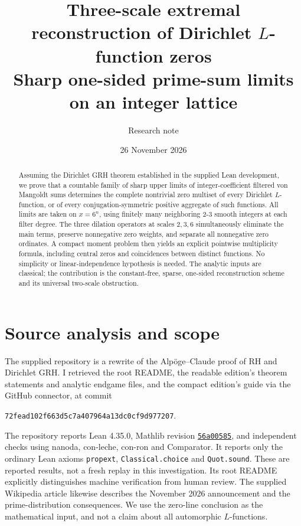 \documentclass[11pt]{article}
\title{Three-scale extremal reconstruction of Dirichlet $L$-function zeros\\[4pt]\large Sharp one-sided prime-sum limits on an integer lattice}
\author{Research note}
\date{26 November 2026}
\theoremstyle{remark}\newtheorem{remark}[theorem]{Remark}
\begin{document}
\maketitle
\begin{abstract}
Assuming the Dirichlet GRH theorem established in the supplied Lean development, we prove that a countable family of sharp upper limits of integer-coefficient filtered von Mangoldt sums determines the complete nontrivial zero multiset of every Dirichlet $L$-function, or of every conjugation-symmetric positive aggregate of such functions. All limits are taken on $x=6^n$, using finitely many neighboring $2$-$3$ smooth integers at each filter degree. The three dilation operators at scales $2,3,6$ simultaneously eliminate the main terms, preserve nonnegative zero weights, and separate all nonnegative zero ordinates. A compact moment problem then yields an explicit pointwise multiplicity formula, including central zeros and coincidences between distinct functions. No simplicity or linear-independence hypothesis is needed. The analytic inputs are classical; the contribution is the constant-free, sparse, one-sided reconstruction scheme and its universal two-scale obstruction.
\end{abstract}

\section{Source analysis and scope}
The supplied repository \cite{repo} is a rewrite of the Alp\"oge--Claude proof of RH and Dirichlet GRH. I retrieved the root README, the readable edition's theorem statements and analytic endgame files, and the compact edition's guide via the GitHub connector, at commit
\begin{center}\small\texttt{72fead102f663d5c7a407964a13dc0cf9d977207}.\end{center}
The repository reports Lean 4.35.0, Mathlib revision \href{https://github.com/leanprover-community/mathlib4/commit/56a005855ea17e0b0958f73ec801ae140b0a1679}{\texttt{56a00585}}, and independent checks using nanoda, con-leche, con-ron and Comparator. It reports only the ordinary Lean axioms \texttt{propext}, \texttt{Classical.choice} and \texttt{Quot.sound}. These are reported results, not a fresh replay in this investigation. Its root README explicitly distinguishes machine verification from human review. The supplied Wikipedia article \cite{wiki} likewise describes the November 2026 announcement and the prime-distribution consequences. We use the zero-line conclusion as the mathematical input, and not a claim about all automorphic $L$-functions.
\end{document}
